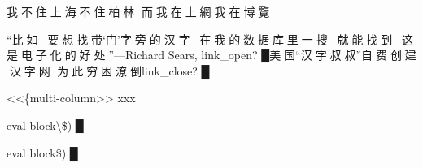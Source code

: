 
\begingroup\mktsObeyAllLines{}
{\cn{}我不住上海不住柏林
而我在上網我在博覽}
\endgroup{}\mktsShowpar\par
“{\cn{}比如，要想找带}‘{\cn{}门}’{\cn{}字旁的汉字，在我的数据库里一搜，就能找到，这是电子化的好处}”—Richard Sears, {\mktsStyleBold\color{violet}{%
\mktsStyleSymbol}link\_open? {\mktsStyleSymbol█}}{\cn{}美国}“{\cn{}汉字叔叔}”{\cn{}自费创建汉字网 为此穷困潦倒}{\mktsStyleBold\color{violet}{%
\mktsStyleSymbol}link\_close? {\mktsStyleSymbol█}}\mktsShowpar\par
<<\{multi-column>>
xxx\mktsShowpar\par
{\mktsStyleCode{}{\mktsStyleBold\color{violet}{%
\mktsStyleSymbol█}(\textbackslash{}\$ {\mktsStyleSymbol}}eval block{\mktsStyleBold\color{violet}{%
\mktsStyleSymbol}\textbackslash{}\$) {\mktsStyleSymbol█}}}\mktsShowpar\par
{\mktsStyleCode{}{\mktsStyleBold\color{violet}{%
\mktsStyleSymbol█}(\$ {\mktsStyleSymbol}}eval block{\mktsStyleBold\color{violet}{%
\mktsStyleSymbol}\$) {\mktsStyleSymbol█}}}\mktsShowpar\par


